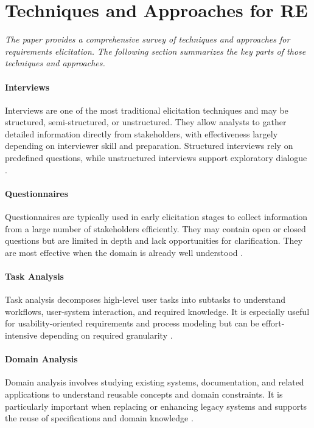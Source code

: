 \section{Techniques and Approaches for RE}

\textit{The paper provides a comprehensive survey of techniques and approaches for requirements elicitation. The following section summarizes the key parts of those techniques and approaches.}

\paragraph{Interviews}

Interviews are one of the most traditional elicitation techniques and may be structured, semi-structured, or unstructured. They allow analysts to gather detailed information directly from stakeholders, with effectiveness largely depending on interviewer skill and preparation. Structured interviews rely on predefined questions, while unstructured interviews support exploratory dialogue \cite{Agarwal1990,Holtzblatt1995}.

\paragraph{Questionnaires}

Questionnaires are typically used in early elicitation stages to collect information from a large number of stakeholders efficiently. They may contain open or closed questions but are limited in depth and lack opportunities for clarification. They are most effective when the domain is already well understood \cite{Foddy1994}.

\paragraph{Task Analysis}

Task analysis decomposes high-level user tasks into subtasks to understand workflows, user-system interaction, and required knowledge. It is especially useful for usability-oriented requirements and process modeling but can be effort-intensive depending on required granularity \cite{Carlshamre1996,Richardson1998}.

\paragraph{Domain Analysis}

Domain analysis involves studying existing systems, documentation, and related applications to understand reusable concepts and domain constraints. It is particularly important when replacing or enhancing legacy systems and supports the reuse of specifications and domain knowledge \cite{Sutcliffe1998,Jackson2000}.

